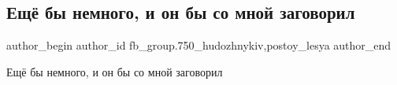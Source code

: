  
 
 
 
 

\subsection{Ещё бы немного, и он бы со мной заговорил}
\label{sec:02_04_2018.fb.fb_group.750_hudozhnykiv.2.esche_by_nemnogo_on_by_zagovoril}
 
\ifcmt
 author_begin
   author_id fb_group.750_hudozhnykiv,postoy_lesya
 author_end
\fi

Ещё бы немного, и он бы со мной заговорил 🙂

